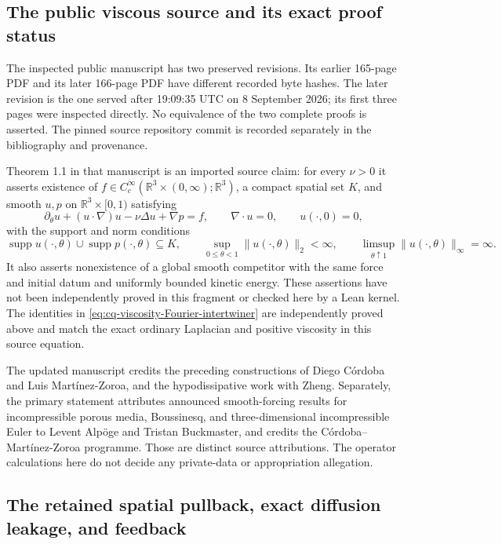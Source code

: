 \subsection{The public viscous source and its exact proof status}
\label{sec:cq-public-NS-source}

The inspected public manuscript \cite{cqNS2026} has two preserved
revisions. Its earlier 165-page PDF and its later 166-page PDF
have different recorded byte hashes. The later revision is the
one served after 19:09:35 UTC on 8 September 2026; its first
three pages were inspected directly. No equivalence of the
two complete proofs is asserted. The pinned source repository
commit is recorded separately in the bibliography and provenance.

Theorem 1.1 in that manuscript is an imported source claim:
for every $\nu>0$ it asserts existence of
$f\in C_c^\infty(\mathbb R^3\times(0,\infty);\mathbb R^3)$,
a compact spatial set $K$, and smooth $u,p$ on
$\mathbb R^3\times[0,1)$ satisfying
\[
 \partial_\theta u+(u\cdot\nabla)u-\nu\Delta u+\nabla p=f,
 \qquad \nabla\cdot u=0,\qquad u(\cdot,0)=0,
\]
with the support and norm conditions
\[
 \operatorname{supp}u(\cdot,\theta)\cup
 \operatorname{supp}p(\cdot,\theta)\subseteq K,\qquad
 \sup_{0\leq\theta<1}\|u(\cdot,\theta)\|_2<\infty,\qquad
 \limsup_{\theta\uparrow1}\|u(\cdot,\theta)\|_\infty=\infty .
\]
It also asserts nonexistence of a global smooth competitor
with the same force and initial datum and uniformly bounded
kinetic energy. These assertions have not been independently
proved in this fragment or checked here by a Lean kernel.
The identities in \eqref{eq:cq-viscosity-Fourier-intertwiner}
are independently proved above and match the exact ordinary
Laplacian and positive viscosity in this source equation.

The updated manuscript credits the preceding constructions
of Diego C\'ordoba and Luis Mart\'inez-Zoroa, and the
hypodissipative work with Zheng. Separately, the primary
statement \cite{cqABStatement} attributes announced
smooth-forcing results for incompressible porous media,
Boussinesq, and three-dimensional incompressible Euler to
Levent Alp\"oge and Tristan Buckmaster, and credits the
C\'ordoba--Mart\'inez-Zoroa programme. Those are distinct
source attributions. The operator calculations here do not
decide any private-data or appropriation allegation.

\subsection{The retained spatial pullback, exact diffusion leakage, and feedback}
\label{sec:cq-spatial-diffusion-splitting}

